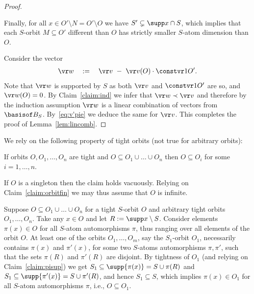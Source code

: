 \begin{proof}
\begin{claimproof}
Finally, for all  $x\in O'\setminus N = O' \setminus O$ we have
$S' \subsetneq \supp x \cap S$, which implies that each $S$-orbit $M\subseteq O'$ different than $O$ has strictly
smaller $S$-atom dimension than $O$.
% 
\end{claimproof}

Consider the vector
%
\begin{align} \label{eq:v'pie}
\vr w \quad := \quad \vr v \ - \ \vr v(O) \cdot \constvr 1 {O'}.
\end{align}
%
Note that $\vr w$ is supported by $S$ as both $\vr v$ and $\constvr 1 {O'}$ are so, and
$\vr w(O) = 0$.
By Claim~\ref{claim:ind} we infer that $\vr w \prec \vr v$
and therefore by the induction assumption $\vr w$ is a linear combination of vectors from $\basisof B_S$. 
By~\eqref{eq:v'pie} we deduce the same for $\vr v$.
This completes the proof of Lemma~\ref{lem:lincomb}.
 \end{proof}
%

We rely on the following property of tight orbits (not true for arbitrary orbits):
\begin{claim} \label{claim:inclcup}
If orbits $O, O_1, \ldots, O_n$ are tight and
$O \subseteq O_1 \cup \ldots \cup O_n$ then
$O\subseteq O_i$ for some $i=1, \ldots, n$.
\end{claim}
%
\begin{claimproof}
If $O$ is a singleton then the claim holds vacuously.
Relying on Claim~\ref{claim:orbitfin} we may thus assume that $O$ is infinite.

Suppose $O \subseteq O_1 \cup \ldots \cup O_n$ for a tight $S$-orbit $O$ and arbitrary tight orbits
$O_1, \ldots, O_n$.
Take any $x\in O$ and let $R := \supp x \setminus S$.
Consider elements $\pi(x)\in O$ for all $S$-atom automorphisms $\pi$, thus ranging over all elements of 
the orbit $O$.
At least one of the orbits $O_1, \ldots, O_m$, say the $S_1$-orbit $O_1$, necessarily contains $\pi(x)$ and $\pi'(x)$, for 
some two $S$-atoms automorphisms $\pi, \pi'$, such that the sets $\pi(R)$ and $\pi'(R)$ 
are disjoint.
By tightness of $O_1$ (and relying on Claim~\ref{claim:pisup}) we get $S_1 \subseteq \supp{\pi(x)} = S \cup \pi(R)$ and
$S_1 \subseteq \supp{\pi'(x)} = S \cup \pi'(R)$, and hence $S_1 \subseteq S$, 
which implies  $\pi(x)\in O_1$ for all $S$-atom automorphisms $\pi$, i.e., $O\subseteq O_1$.
\end{claimproof}

